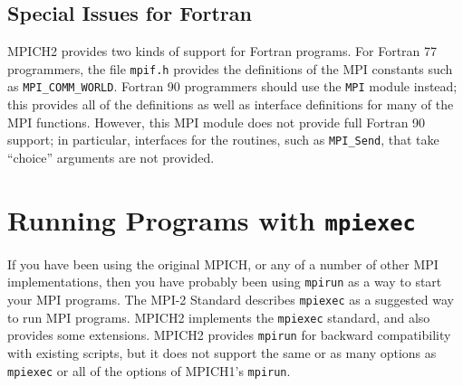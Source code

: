\documentclass[dvipdfm,11pt]{article}
\begin{document}
\subsection{Special Issues for Fortran}
\label{sec:fortran}

MPICH2 provides two kinds of support for Fortran programs.  For
Fortran 77 programmers, the file \texttt{mpif.h} provides the
definitions of the MPI constants such as \texttt{MPI\_COMM\_WORLD}.
Fortran 90 programmers should use the \texttt{MPI} module instead;
this provides all of the definitions as well as interface definitions
for many of the MPI functions.  However, this MPI module does not
provide full Fortran 90 support; in particular, interfaces for the
routines, such as \texttt{MPI\_Send}, that take ``choice'' arguments
are not provided.




\section{Running Programs with \texttt{mpiexec}}
\label{sec:mpiexec}

If you have been using the original MPICH, or any of a number of other MPI
implementations, then you have probably been using \texttt{mpirun} as a
way to start your MPI programs.
The MPI-2 Standard describes \texttt{mpiexec} as a suggested way to run
MPI programs.  MPICH2 implements the \texttt{mpiexec} standard, and also
provides some extensions.  MPICH2 provides \texttt{mpirun} for backward
compatibility with existing scripts, but it does not support the same or
as many options as \texttt{mpiexec} or all of the options of MPICH1's
\texttt{mpirun}.   
\end{document}
